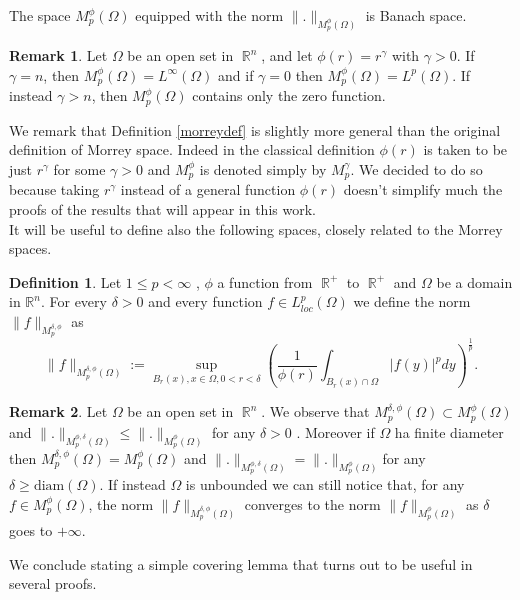 \documentclass[12pt]{article}
\theoremstyle{definition}
\newtheorem{definition}{Definition}
\newtheorem{remark}{Remark}
\DeclareMathOperator\rr{\mathbb{R}}
\begin{document}
The space $M_p^\phi(\Omega)$ equipped with the norm $\|.\|_{M_p^\phi(\Omega)}$ is Banach space.
\begin{remark}
	Let $\Omega$ be an open set in $\rr^n$, and let $\phi(r)=r^\gamma$ with $\gamma>0.$ If $\gamma=n$, then $M_p^\phi(\Omega)=L^\infty(\Omega)$ and if $\gamma=0$ then $M_p^\phi(\Omega)=L^p(\Omega)$. If instead $\gamma>n$, then $M_p^\phi(\Omega)$ contains only the zero function.
\end{remark}

We remark that Definition \ref{morreydef}  is slightly more general than the original definition of Morrey space. Indeed in the classical definition $\phi(r)$ is taken to be just $r^\gamma$ for some $\gamma>0$ and $M_p^\phi$ is denoted simply by $M_p^\gamma.$ We decided to do so because taking $r^\gamma$ instead of a general function $\phi(r)$ doesn't simplify much the proofs of the results that will appear in this work.\\
It will be useful to define also the following spaces, closely related to the Morrey spaces. 
\begin{definition}
Let $1\le p< \infty$ , $\phi$ a function from $\rr^+$ to $\rr^+$ and $\Omega$ be a domain in $\mathbb{R}^n$. For every $\delta>0$ and every function $f \in L^p_{loc}(\Omega)$ we define the norm $\|f\|_{M^{\delta,\phi}_p}$ as
\[\| f\|_{M^{\delta,\phi}_p(\Omega)} := \sup_{B_r(x), x \in \Omega, 0<r<\delta} \left(  \frac{1}{\phi(r)}\int_{B_r(x)\cap \Omega} |f(y)|^p dy \right )^{\frac{1}{p}}.\]
\end{definition}
\begin{remark}
	Let $\Omega$ be an open set in $\rr^n$. We observe that $M_p^{\delta,\phi}(\Omega)\subset M_p^\phi(\Omega) $ and $\|.\|_{M_p^{\phi,\delta}(\Omega)}\le\|.\|_{M_p^{\phi}(\Omega)}$ for any $\delta>0$ . Moreover if $\Omega$ ha finite diameter then $M_p^{\delta,\phi}(\Omega)= M_p^\phi(\Omega) $ and $\|.\|_{M_p^{\phi,\delta}(\Omega)}=\|.\|_{M_p^{\phi}(\Omega)}$for any $\delta\ge \text{diam}(\Omega).$ If instead $\Omega$ is unbounded we can still notice that, for any $f \in M_p^\phi(\Omega)$, the norm $\|f\|_{M_p^{\delta,\phi}(\Omega)}$ converges to the norm $\|f\|_{M_p^{\phi}(\Omega)}$ as $\delta$ goes to $+\infty.$ 
\end{remark}
We conclude stating a simple covering lemma that turns out to be useful in several proofs. 
\end{document}
